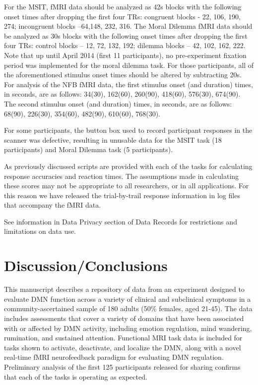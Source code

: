 For the MSIT, fMRI data should be analyzed as 42s blocks with the following onset times after dropping the first four TRs: congruent blocks - 22, 106, 190, 274; incongruent blocks –64,148, 232, 316. The Moral Dilemma fMRI data should be analyzed as 30s blocks with the following onset times after dropping the first four TRs: control blocks – 12, 72, 132, 192; dilemma blocks – 42, 102, 162, 222. Note that up until April 2014 (first 11 participants), no pre-experiment fixation period was implemented for the moral dilemma task. For those participants, all of the aforementioned stimulus onset times should be altered by subtracting 20s. For analysis of the NFB fMRI data, the first stimulus onset (and duration) times, in seconds, are as follows: 34(30), 162(60), 260(90), 418(60), 576(30), 674(90). The second stimulus onset (and duration) times, in seconds, are as follows: 68(90), 226(30), 354(60), 482(90), 610(60), 768(30).

For some participants, the button box used to record participant responses in the scanner was defective, resulting in unusable data for the MSIT task (18 participants) and Moral Dilemma task (5 participants).

As previously discussed scripts are provided with each of the tasks for calculating response accuracies and reaction times. The assumptions made in calculating these scores may not be appropriate to all researchers, or in all applications. For this reason we have released the trial-by-trail response information in log files that accompany the fMRI data.

See information in Data Privacy section of Data Records for restrictions and limitations on data use.

\section{Discussion/Conclusions}

This manuscript describes a repository of data from an experiment designed to evaluate DMN function across a variety of clinical and subclinical symptoms in a community-ascertained sample of 180 adults (50\% females, aged 21-45). The data includes assessments that cover a variety of domains that have been associated with or affected by DMN activity, including emotion regulation, mind wandering, rumination, and sustained attention. Functional MRI task data is included for tasks shown to activate, deactivate, and localize the DMN, along with a novel real-time fMRI neurofeedback paradigm for evaluating DMN regulation. Preliminary analysis of the first 125 participants released for sharing confirms that each of the tasks is operating as expected.

